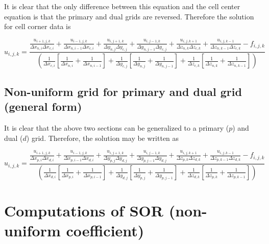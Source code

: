 \documentclass[landscape,11pt]{article}
\begin{document}
It is clear that the only difference between this equation and the cell center equation is that the primary and dual grids are reversed. Therefore the solution for cell corner data is

\begin{equation}
	u_{i,j,k} =
	\frac{
	\frac{u_{i+1,j,k}}{\Delta x_{n,i} \Delta x_{c,i}} + \frac{u_{i-1,j,k}}{\Delta x_{n,i-1} \Delta x_{c,i}} +
	\frac{u_{i,j+1,k}}{\Delta y_{n,j} \Delta y_{c,j}} + \frac{u_{i,j-1,k}}{\Delta y_{n,j-1} \Delta y_{c,j}} +
	\frac{u_{i,j,k+1}}{\Delta z_{n,k} \Delta z_{c,k}} + \frac{u_{i,j,k-1}}{\Delta z_{n,k-1} \Delta z_{c,k}}
	- f_{i,j,k} }{
	\left(
	\frac{ 1 }{ \Delta x_{c,i} }
	\left[
	\frac{ 1 }{ \Delta x_{n,i} } +
	\frac{ 1 }{ \Delta x_{n,i-1} }
	\right] +
	\frac{ 1 }{ \Delta y_{c,j} }
	\left[
	\frac{ 1 }{ \Delta y_{n,j} } +
	\frac{ 1 }{ \Delta y_{n,j-1} }
	\right] +
	\frac{ 1 }{ \Delta z_{c,k} }
	\left[
	\frac{ 1 }{ \Delta z_{n,k} } +
	\frac{ 1 }{ \Delta z_{n,k-1} }
	\right]
	\right)
	}
\end{equation}


\subsection{Non-uniform grid for primary and dual grid (general form)}
It is clear that the above two sections can be generalized to a primary ($p$) and dual ($d$) grid. Therefore, the solution may be written as


\begin{equation}
	u_{i,j,k} =
	\frac{
	\frac{u_{i+1,j,k}}{\Delta x_{p,i} \Delta x_{d,i}} + \frac{u_{i-1,j,k}}{\Delta x_{p,i-1} \Delta x_{d,i}} +
	\frac{u_{i,j+1,k}}{\Delta y_{p,j} \Delta y_{d,j}} + \frac{u_{i,j-1,k}}{\Delta y_{p,j-1} \Delta y_{d,j}} +
	\frac{u_{i,j,k+1}}{\Delta z_{p,k} \Delta z_{d,k}} + \frac{u_{i,j,k-1}}{\Delta z_{p,k-1} \Delta z_{d,k}}
	- f_{i,j,k} }{
	\left(
	\frac{ 1 }{ \Delta x_{d,i} }
	\left[
	\frac{ 1 }{ \Delta x_{p,i} } +
	\frac{ 1 }{ \Delta x_{p,i-1} }
	\right] +
	\frac{ 1 }{ \Delta y_{d,j} }
	\left[
	\frac{ 1 }{ \Delta y_{p,j} } +
	\frac{ 1 }{ \Delta y_{p,j-1} }
	\right] +
	\frac{ 1 }{ \Delta z_{d,k} }
	\left[
	\frac{ 1 }{ \Delta z_{p,k} } +
	\frac{ 1 }{ \Delta z_{p,k-1} }
	\right]
	\right)
	}
\end{equation}


\section{Computations of SOR (non-uniform coefficient)}
\end{document}
